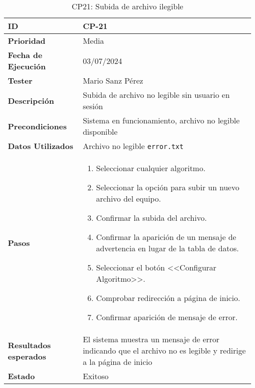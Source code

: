 \begin{table}[ht]
	\centering
	\renewcommand{\arraystretch}{1.5} %
	\begin{tabular}{>{\raggedright\arraybackslash}p{4cm} p{9.5cm}}
		\hline
		\rowcolor{gray!20}
		\textbf{ID} & CP-21\\
		\hline
		\rowcolor{white}
		\textbf{Prioridad} & Media \\
		\hline
		\rowcolor{gray!20}
		\textbf{Fecha de Ejecución} & 03/07/2024 \\
		\hline
		\rowcolor{white}
		\textbf{Tester} & Mario Sanz Pérez \\
		\hline
		\rowcolor{gray!20}
		\textbf{Descripción} & Subida de archivo no legible sin usuario en sesión\\
		\hline
		\rowcolor{white}
		\textbf{Precondiciones} & Sistema en funcionamiento, archivo no legible disponible\\
		\hline
		\rowcolor{white}
		\textbf{Datos Utilizados} & Archivo no legible \texttt{error.txt}\\
		\hline
		\rowcolor{gray!20}
		\textbf{Pasos} & \begin{enumerate}
			\item Seleccionar cualquier algoritmo.
			\item Seleccionar la opción para subir un nuevo archivo del equipo.
			\item Confirmar la subida del archivo.
			\item Confirmar la aparición de un mensaje de advertencia en lugar de la tabla de datos.
			\item Seleccionar el botón <<Configurar Algoritmo>>.
			\item Comprobar redirección a página de inicio.
			\item Confirmar aparición de mensaje de error.
		\end{enumerate}\\
		\hline
		\rowcolor{gray!20}
		\textbf{Resultados esperados} & El sistema muestra un mensaje de error indicando que el archivo no es legible y redirige a la página de inicio\\
		\hline
		\rowcolor{white}
		\textbf{Estado} & Exitoso\\
		\hline
	\end{tabular}
	\caption[CP21: Subida de archivo ilegible]{CP21: Subida de archivo ilegible}
\end{table}


